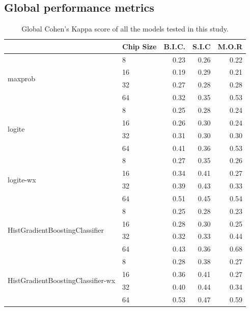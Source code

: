 \pagebreak

\subsection{Global performance metrics}
\label{sec:appendix_perf}

\begin{table}
    \centering
\begin{tabular}{llrrr}
    \toprule
     & Chip Size & B.I.C. & S.I.C & M.O.R \\
    \midrule
    \multirow[t]{4}{*}{maxprob} & 8 & 0.23 & 0.26 & 0.22 \\
    & 16 & 0.19 & 0.29 & 0.21 \\
    & 32 & 0.27 & 0.28 & 0.28 \\
    & 64 & 0.32 & 0.35 & 0.53 \\
   \cline{1-5}
   \multirow[t]{4}{*}{logite} & 8 & 0.25 & 0.28 & 0.24 \\
    & 16 & 0.26 & 0.30 & 0.24 \\
    & 32 & 0.31 & 0.30 & 0.30 \\
    & 64 & 0.41 & 0.36 & 0.53 \\
   \cline{1-5}
   \multirow[t]{4}{*}{logite-wx} & 8 & 0.27 & 0.35 & 0.26 \\
    & 16 & 0.34 & 0.41 & 0.27 \\
    & 32 & 0.39 & 0.43 & 0.33 \\
    & 64 & 0.51 & 0.45 & 0.54 \\
   \cline{1-5}
   \multirow[t]{4}{*}{HistGradientBoostingClassifier} & 8 & 0.25 & 0.28 & 0.23 \\
    & 16 & 0.28 & 0.30 & 0.25 \\
    & 32 & 0.32 & 0.33 & 0.44 \\
    & 64 & 0.43 & 0.36 & 0.68 \\
   \cline{1-5}
   \multirow[t]{4}{*}{HistGradientBoostingClassifier-wx} & 8 & 0.28 & 0.38 & 0.27 \\
    & 16 & 0.36 & 0.41 & 0.27 \\
    & 32 & 0.40 & 0.44 & 0.34 \\
    & 64 & 0.53 & 0.47 & 0.59 \\
    \bottomrule
\end{tabular}
\caption{\label{tab:global_kappa}\footnotesize Global Cohen's Kappa score of all the models
tested in this study.}
\end{table}

